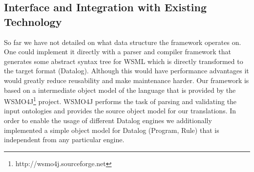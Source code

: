 \subsection{Interface and Integration with Existing Technology}
So far we have not detailed on what data structure the framework
operates on. One could implement it directly with a parser and
compiler framework that generates some abstract syntax tree for WSML
which is directly transformed to the target format (Datalog).
Although this would have performance advantages it would greatly
reduce reusability and make maintenance harder. Our framework is
based on a intermediate object model of the language that is
provided by the WSMO4J\footnote{http://wsmo4j.sourceforge.net}
project. WSMO4J performs the task of parsing and validating the
input ontologies and provides the source object model for our
translations. In order to enable the usage of different Datalog
engines we additionally implemented a simple object model for
Datalog (Program, Rule) that is independent from any particular
engine.
